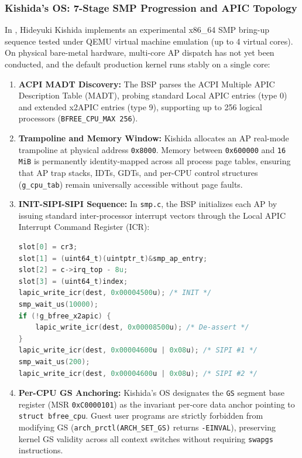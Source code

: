 \documentclass[10pt,journal,compsoc,twocolumn]{article}
\begin{document}
\subsubsection{Kishida's OS: 7-Stage SMP Progression and APIC Topology}
In , Hideyuki Kishida implements an experimental x86\_64 SMP bring-up sequence tested under QEMU virtual machine emulation (up to 4 virtual cores). On physical bare-metal hardware, multi-core AP dispatch has not yet been conducted, and the default production kernel runs stably on a single core:
\begin{enumerate}[leftmargin=*]
    \item \textbf{ACPI MADT Discovery:} The BSP parses the ACPI Multiple APIC Description Table (MADT), probing standard Local APIC entries (type 0) and extended x2APIC entries (type 9), supporting up to 256 logical processors (\texttt{BFREE\_CPU\_MAX 256}).
    \item \textbf{Trampoline and Memory Window:} Kishida allocates an AP real-mode trampoline at physical address \texttt{0x8000}. Memory between \texttt{0x600000} and \texttt{16 MiB} is permanently identity-mapped across all process page tables, ensuring that AP trap stacks, IDTs, GDTs, and per-CPU control structures (\texttt{g\_cpu\_tab}) remain universally accessible without page faults.
    \item \textbf{INIT-SIPI-SIPI Sequence:} In \texttt{smp.c}, the BSP initializes each AP by issuing standard inter-processor interrupt vectors through the Local APIC Interrupt Command Register (ICR):
    \begin{lstlisting}[language=C]
slot[0] = cr3;
slot[1] = (uint64_t)(uintptr_t)&smp_ap_entry;
slot[2] = c->irq_top - 8u;
slot[3] = (uint64_t)index;
lapic_write_icr(dest, 0x00004500u); /* INIT */
smp_wait_us(10000);
if (!g_bfree_x2apic) {
    lapic_write_icr(dest, 0x00008500u); /* De-assert */
}
lapic_write_icr(dest, 0x00004600u | 0x08u); /* SIPI #1 */
smp_wait_us(200);
lapic_write_icr(dest, 0x00004600u | 0x08u); /* SIPI #2 */
    \end{lstlisting}
    \item \textbf{Per-CPU GS Anchoring:} Kishida's OS designates the \texttt{GS} segment base register (MSR \texttt{0xC0000101}) as the invariant per-core data anchor pointing to \texttt{struct bfree\_cpu}. Guest user programs are strictly forbidden from modifying GS (\texttt{arch\_prctl(ARCH\_SET\_GS)} returns \texttt{-EINVAL}), preserving kernel GS validity across all context switches without requiring \texttt{swapgs} instructions.
\end{enumerate}
\end{document}
